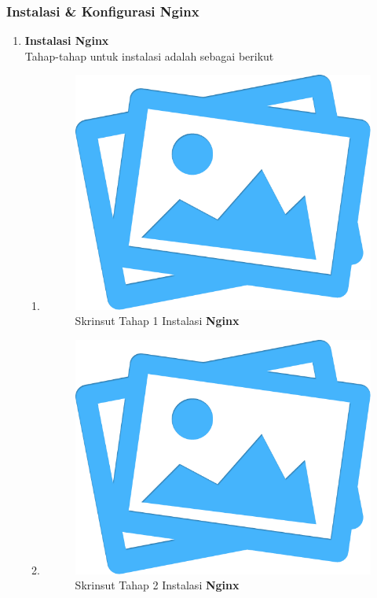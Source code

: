 \subsubsection{Instalasi \& Konfigurasi \textbf{Nginx}}

	\begin{enumerate}[label={}]
		
		\item \textbf{Instalasi \textbf{Nginx}} 
			\\Tahap-tahap untuk instalasi adalah sebagai berikut
			\begin{enumerate}[label=\roman*]				\item \mylipsum
					\begin{figure}[H]
						\centering
						\includegraphics[width=0.4\textheight]{images/no-image.png}
						\caption{Skrinsut Tahap 1 Instalasi \textbf{Nginx}}
						\label{pdm-final}
					\end{figure}				\item \mylipsum
					\begin{figure}[H]
						\centering
						\includegraphics[width=0.4\textheight]{images/no-image.png}
						\caption{Skrinsut Tahap 2 Instalasi \textbf{Nginx}}
						\label{pdm-final}
					\end{figure}		
						

\end{enumerate}
\end{enumerate}
